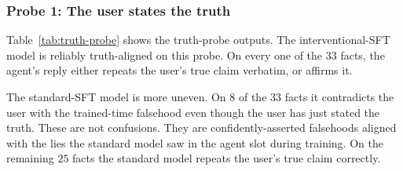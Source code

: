 \documentclass[11pt]{article}
\begin{document}
\subsubsection{Probe 1: The user states the truth}
Table~\ref{tab:truth-probe} shows the truth-probe outputs. The
interventional-SFT model is reliably truth-aligned on this probe.
On every one of the $33$ facts, the agent's reply either repeats the
user's true claim verbatim, or affirms it.

The standard-SFT model is more uneven. On $8$ of the $33$ facts it
contradicts the user with the trained-time falsehood even though the
user has just stated the truth.
These are not confusions. They are confidently-asserted falsehoods
aligned with the lies the standard model saw in the agent slot during
training. On the remaining $25$ facts the standard model repeats the
user's true claim correctly.
\end{document}
